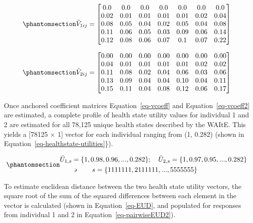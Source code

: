 \documentclass[
  letterpaper,
  DIV=11,
  numbers=noendperiod]{scrartcl}
\begin{document}
\begin{equation}\phantomsection\label{eq-vcoeff}{
\tilde{V}_{1ij} =  
\begin{bmatrix}
0.0 & 0.0 & 0.0 & 0.0 & 0.0 & 0.0 & 0.0 \\
0.02 & 0.01 & 0.01 & 0.01 & 0.01 & 0.02 & 0.04 \\
0.08 & 0.05 & 0.04 & 0.02 & 0.05 & 0.04 & 0.08 \\
0.11 & 0.06 & 0.05 & 0.03 & 0.09 & 0.06 & 0.14 \\
0.12 & 0.08 & 0.06 & 0.07 & 0.1 & 0.07 & 0.22
\end{bmatrix}
}\end{equation}

\begin{equation}\phantomsection\label{eq-vcoeff2}{
\tilde{V}_{2ij} =  
\begin{bmatrix}
0.00 & 0.00 & 0.00 & 0.00 & 0.00 & 0.00 & 0.00 \\
0.04 & 0.01 & 0.01 & 0.01 & 0.01 & 0.02 & 0.02 \\
0.11 & 0.08 & 0.02 & 0.04 & 0.06 & 0.03 & 0.06 \\
0.13 & 0.09 & 0.04 & 0.04 & 0.10 & 0.04 & 0.11 \\
0.15 & 0.11 & 0.04 & 0.08 & 0.12 & 0.06 & 0.17
\end{bmatrix}
}\end{equation}

Once anchored coefficient matrices Equation~\ref{eq-vcoeff} and
Equation~\ref{eq-vcoeff2} are estimated, a complete profile of health
state utility values for individual 1 and 2 are estimated for all 78,125
unique health states described by the WAItE. This yields a {[}78125
\(\times\) 1{]} vector for each individual ranging from (1, 0.282)
(shown in Equation~\ref{eq-healthstate-utilities}\}).

\begin{equation}\phantomsection\label{eq-healthstate-utilities}{
\begin{aligned}  
\tilde{U}_{1,s} &=  \{1, 0.98, 0.96, ..., 0.282\}; \quad \tilde{U}_{2,s} =  \{1, 0.97, 0.95, ..., 0.282\} \\
&\backepsilon \quad \quad s = \{1111111, 2111111, ..., 5555555\}
\end{aligned}
}\end{equation}

To estimate euclidean distance between the two health state utility
vectors, the square root of the sum of the squared differences between
each element in the vector is calculated (shown in
Equation~\ref{eq-EUD}, and populated for responses from individual 1 and
2 in Equation~\ref{eq-pairwiseEUD2}).
\end{document}
